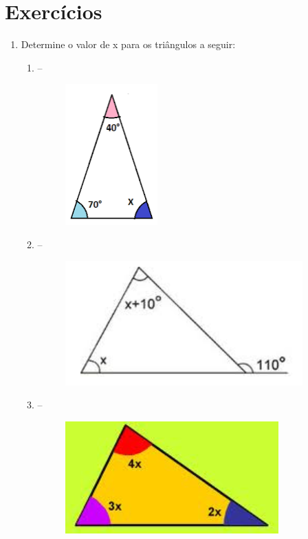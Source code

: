 \documentclass[11pt]{article}
\begin{document}
\newpage

\section{Exercícios}
\begin{enumerate}
	\item Determine o valor de x para os triângulos a seguir:
		\begin{enumerate}
			\item --
				\begin{figure}[H]
					\centering
					\includegraphics[width=0.3\linewidth]{imgs/ex1.png}
				\end{figure}
			\item --
				\begin{figure}[H]
					\centering
					\includegraphics[width=0.5\linewidth]{imgs/ex2.png}
				\end{figure}
			\item --
				\begin{figure}[H]
					\centering
					\includegraphics[width=0.5\linewidth]{imgs/ex3.png}
				\end{figure}
		\end{enumerate}


\end{enumerate}
\end{document}
